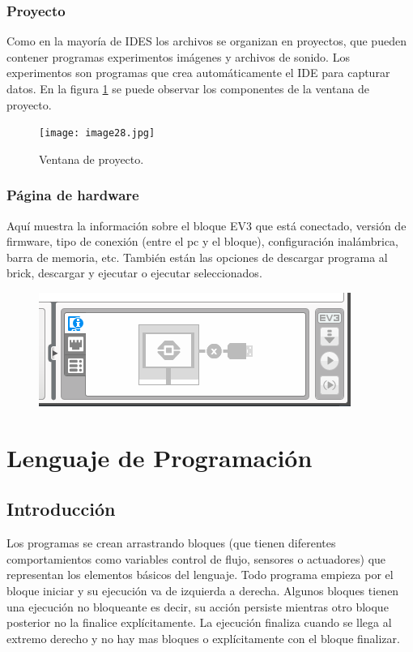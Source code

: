 \documentclass[12pt,a4paper]{article}
\begin{document}
\subsubsection{Proyecto}

Como en la mayoría de IDES los archivos se organizan en proyectos, que pueden
contener programas experimentos imágenes y archivos de sonido. Los experimentos
son programas que crea automáticamente el IDE para capturar datos. En la figura
\ref{fig:proyecto} se puede observar los componentes de la ventana de proyecto.

\begin{figure}
	\caption{Ventana de proyecto.\label{fig:proyecto}}
	\texttt{[image: image28.jpg]}
	\centering
\end{figure}

\subsubsection{Página de hardware}
Aquí muestra la información sobre el bloque EV3 que está conectado, versión de
firmware, tipo de conexión (entre el pc y el bloque), configuración inalámbrica,
barra de memoria, etc. También están las opciones de descargar programa al
brick, descargar y ejecutar o ejecutar seleccionados.

\begin{figure}[H]
	\includegraphics{controEV3.PNG}
	\centering
\end{figure}


\section{Lenguaje de Programación}

\subsection{Introducción}

Los programas se crean arrastrando bloques (que tienen diferentes comportamientos
como variables control de flujo, sensores o actuadores) que representan los
elementos básicos del lenguaje. Todo programa empieza por el bloque iniciar y su
ejecución va de izquierda a derecha. Algunos bloques tienen una ejecución no
bloqueante es decir, su acción persiste mientras otro bloque posterior no la
finalice explícitamente. La ejecución finaliza cuando se llega al extremo derecho
y no hay mas bloques o explícitamente con el bloque finalizar.
\end{document}
